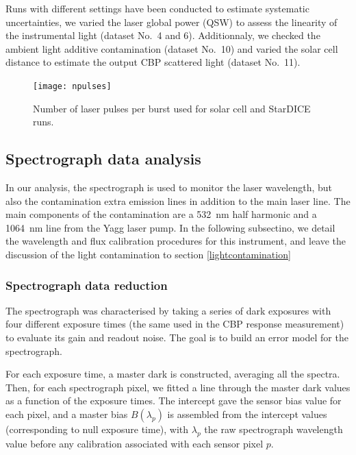 Runs with different settings have been conducted to estimate systematic uncertainties, we varied the laser global power (QSW) to assess the linearity of the instrumental light (dataset No.~4 and 6). Additionnaly, we checked the ambient light additive contamination (dataset No.~10) and varied the solar cell distance to estimate the output CBP scattered light (dataset No.~11).

\begin{figure}[!h]
\centering
\texttt{[image: npulses]}
\caption{Number of laser pulses per burst used for solar cell and StarDICE runs.}\label{fig:npulses}
\end{figure}

\subsection{Spectrograph data analysis}


In our analysis, the spectrograph is used to monitor the laser wavelength, but also the contamination extra emission lines in addition to the main laser line. The main components of the contamination are a \SI{532}{\nm} half harmonic and a \SI{1064}{\nm} line from the Yagg laser pump. In the following subsectino, we detail the wavelength and flux calibration procedures for this instrument, and leave the discussion of the light contamination to section \ref{lightcontamination}



\subsubsection{Spectrograph data reduction}\label{sec:spectro_reduction}


The spectrograph was characterised by taking a series of dark exposures with four different exposure times (the same used in the CBP response measurement) to evaluate its gain and readout noise. The goal is to build an error model for the spectrograph.

For each exposure time, a master dark is constructed, averaging all the spectra. Then, for each spectrograph pixel, we fitted a line through the master dark values as a function of the exposure times. The intercept gave the sensor bias value for each pixel, and a master bias $B(\lambda_p)$ is assembled from the intercept values (corresponding to null exposure time), with $\lambda_p$ the raw spectrograph wavelength value before any calibration associated with each sensor pixel $p$. 


